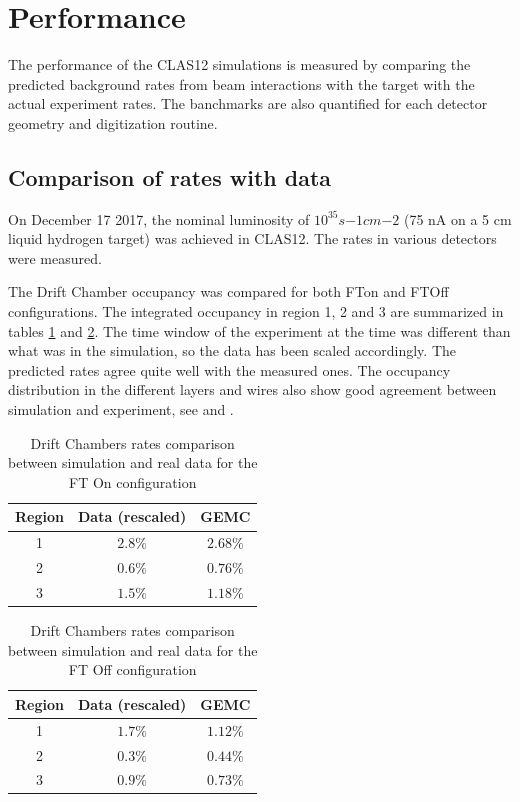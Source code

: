 \section{Performance}

The performance of the CLAS12 simulations is measured by comparing the predicted background rates from beam interactions
with the target with the actual experiment rates. The banchmarks are also quantified for each detector geometry and digitization routine.

\subsection{Comparison of rates with data}
On December 17 2017, the nominal luminosity of $10^{35} s{-1}cm{-2}$
(75 nA on a 5 cm liquid hydrogen target) was achieved in CLAS12.
The rates in various detectors were measured.

The Drift Chamber occupancy was compared for both FTon and FTOff configurations. The integrated occupancy
in region 1, 2 and 3 are summarized in tables \ref{tab:ftOnComparison} and \ref{tab:ftOffComparison}. The
time window of the experiment at the time was different than what was in the simulation, so the data has been scaled
accordingly. The predicted rates agree quite well with the measured ones. The occupancy distribution in the different layers
and wires also show good agreement between simulation and experiment, see  and  .

\begin{table}[h]
	\begin{center}
		\begin{tabular}{| c | c | c |}
			Region & Data (rescaled) &  GEMC \\
			\hline
			1 &  $2.8\%$  & $2.68\%$ \\
			2 &  $0.6\%$  & $0.76\%$ \\
			3 &  $1.5\%$  & $1.18\%$ \\
		\end{tabular}
	\end{center}
	\caption{Drift Chambers rates comparison between simulation and real data for the FT On configuration}\label{tab:ftOnComparison}
\end{table}

\begin{table}[h]
	\begin{center}
		\begin{tabular}{| c | c | c |}
			Region & Data (rescaled) &  GEMC \\
			\hline
			1 &  $1.7\%$  & $1.12\%$ \\
			2 &  $0.3\%$  & $0.44\%$ \\
			3 &  $0.9\%$  & $0.73\%$ \\
		\end{tabular}
	\end{center}
	\caption{Drift Chambers rates comparison between simulation and real data for the FT Off configuration}\label{tab:ftOffComparison}
\end{table}


